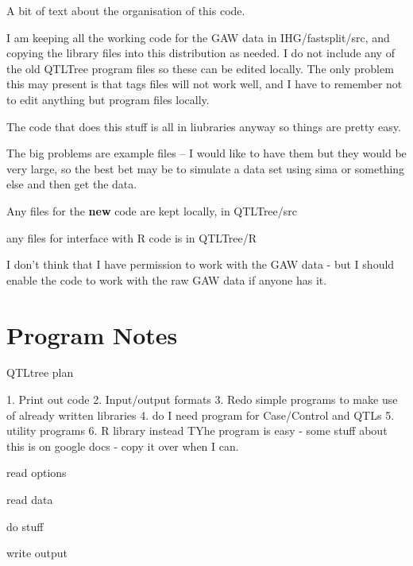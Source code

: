 \documentclass{article}
\begin{document}
A bit of text about the organisation of this code.

I am keeping all the working code for the GAW data in
IHG/fastsplit/src, and copying the library files into this
distribution as needed.  I do not include any of the old QTLTree
program files so these can be edited locally.  The only problem this
may present is that tags files will not work well, and I have to
remember not to edit anything but program files locally.


The code that does this stuff is all in liubraries anyway so things
are pretty easy.

The big problems are example files -- I would like to have them but
they would be very large, so the best bet may be to simulate a data
set using sima or something else and then get the data.
 

Any files for the \textbf{new} code are kept locally, in QTLTree/src

any files for interface with R code is in QTLTree/R


I don't think that I have permission to work with the GAW data - but I
should enable the code to work with the raw GAW data if anyone has it.


\section{Program Notes}
QTLtree plan

   1. Print out code
   2. Input/output formats
   3. Redo simple programs to make use of already written libraries
   4. do I need program for Case/Control and QTLs
   5. utility programs
   6. R library instead
TYhe program is easy - some stuff about this is on google docs - copy it over when I can.

read options

read data

do stuff

write output
\end{document}
